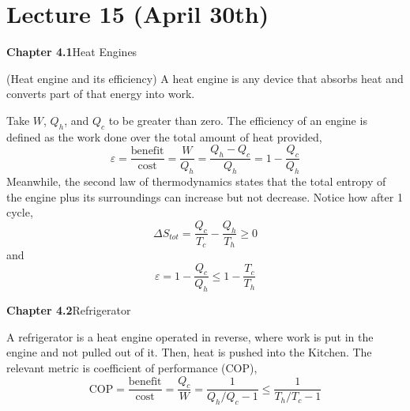 \section{Lecture 15 (April 30th)}
{\bf Chapter 4.1}\hspace{2ex}Heat Engines
\\
\begin{defi}
(Heat engine and its efficiency) A heat engine is any device that absorbs heat and converts part of that energy into work.
\begin{center}
\vspace{2ex}
\vspace{2ex}
\end{center}
Take $W$, $Q_{h}$, and $Q_{c}$ to be greater than zero. The efficiency of an engine is defined as the work done over the total amount of heat provided,
\[\varepsilon =\dfrac{\mathrm{benefit}}{\mathrm{cost}}=\dfrac{W}{Q_{h}}=\dfrac{Q_{h}-Q_{c}}{Q_{h}}=1-\dfrac{Q_{c}}{Q_{h}}\]
Meanwhile, the second law of thermodynamics states that the total entropy of the engine plus its surroundings can increase but not decrease. Notice how after 1 cycle, 
\[\Delta S_{tot}=\dfrac{Q_{c}}{T_{c}}-\dfrac{Q_{h}}{T_{h}}\geq 0\]
and
\[\varepsilon =1-\dfrac{Q_{c}}{Q_{h}}\leq 1-\dfrac{T_{c}}{T_{h}}\]
\end{defi}
\vspace{2ex}
{\bf Chapter 4.2}\hspace{2ex}Refrigerator
\\
\begin{defi}
A refrigerator is a heat engine operated in reverse, where work is put in the engine and not pulled out of it. Then, heat is pushed into the Kitchen. The relevant metric is coefficient of performance (COP), 
\[\mathrm{COP}=\dfrac{\mathrm{benefit}}{\mathrm{cost}}=\dfrac{Q_{c}}{W}=\dfrac{1}{Q_{h}/Q_{c}-1}\leq \dfrac{1}{T_{h}/T_{c}-1}\]

\end{defi}
\vspace{2ex}


